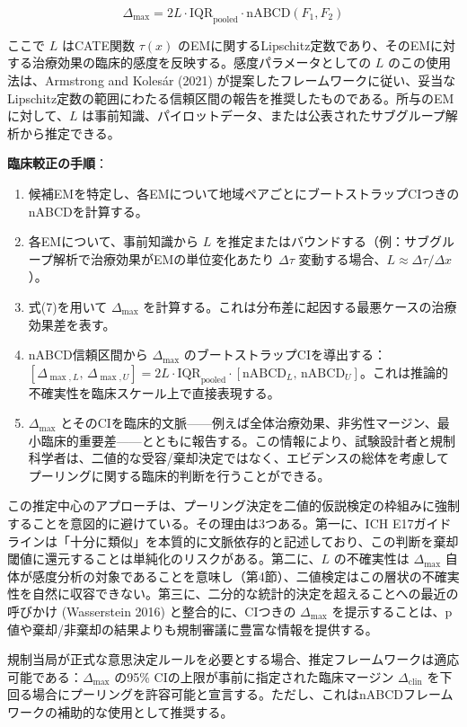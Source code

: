\documentclass[
  a4paper,
  11pt]{ltjsarticle}
\providecommand{\tightlist}{%
  \setlength{\itemsep}{0pt}\setlength{\parskip}{0pt}}\usepackage{longtable,booktabs,array}
\begin{document}
\[\Delta_{\max} = 2L \cdot \text{IQR}_{\text{pooled}} \cdot \text{nABCD}(F_1, F_2) \tag{7}\]

ここで \(L\) はCATE関数 \(\tau(x)\)
のEMに関するLipschitz定数であり、そのEMに対する治療効果の臨床的感度を反映する。感度パラメータとしての
\(L\) のこの使用法は、Armstrong and Kolesár (2021)
が提案したフレームワークに従い、妥当なLipschitz定数の範囲にわたる信頼区間の報告を推奨したものである。所与のEMに対して、\(L\)
は事前知識、パイロットデータ、または公表されたサブグループ解析から推定できる。

\textbf{臨床較正の手順}：

\begin{enumerate}
\def\labelenumi{\arabic{enumi}.}
\tightlist
\item
  候補EMを特定し、各EMについて地域ペアごとにブートストラップCIつきのnABCDを計算する。
\item
  各EMについて、事前知識から \(L\)
  を推定またはバウンドする（例：サブグループ解析で治療効果がEMの単位変化あたり
  \(\Delta\tau\) 変動する場合、\(L \approx \Delta\tau / \Delta x\)）。
\item
  式(7)を用いて \(\Delta_{\max}\)
  を計算する。これは分布差に起因する最悪ケースの治療効果差を表す。
\item
  nABCD信頼区間から \(\Delta_{\max}\)
  のブートストラップCIを導出する：\([\Delta_{\max,L},\, \Delta_{\max,U}] = 2L \cdot \text{IQR}_{\text{pooled}} \cdot [\text{nABCD}_{L},\, \text{nABCD}_{U}]\)。これは推論的不確実性を臨床スケール上で直接表現する。
\item
  \(\Delta_{\max}\)
  とそのCIを臨床的文脈------例えば全体治療効果、非劣性マージン、最小臨床的重要差------とともに報告する。この情報により、試験設計者と規制科学者は、二値的な受容/棄却決定ではなく、エビデンスの総体を考慮してプーリングに関する臨床的判断を行うことができる。
\end{enumerate}

この推定中心のアプローチは、プーリング決定を二値的仮説検定の枠組みに強制することを意図的に避けている。その理由は3つある。第一に、ICH
E17ガイドラインは「十分に類似」を本質的に文脈依存的と記述しており、この判断を棄却閾値に還元することは単純化のリスクがある。第二に、\(L\)
の不確実性は \(\Delta_{\max}\)
自体が感度分析の対象であることを意味し（第4節）、二値検定はこの層状の不確実性を自然に収容できない。第三に、二分的な統計的決定を超えることへの最近の呼びかけ
(Wasserstein 2016) と整合的に、CIつきの \(\Delta_{\max}\)
を提示することは、p値や棄却/非棄却の結果よりも規制審議に豊富な情報を提供する。

規制当局が正式な意思決定ルールを必要とする場合、推定フレームワークは適応可能である：\(\Delta_{\max}\)
の95\% CIの上限が事前に指定された臨床マージン \(\Delta_{\text{clin}}\)
を下回る場合にプーリングを許容可能と宣言する。ただし、これはnABCDフレームワークの補助的な使用として推奨する。
\end{document}
